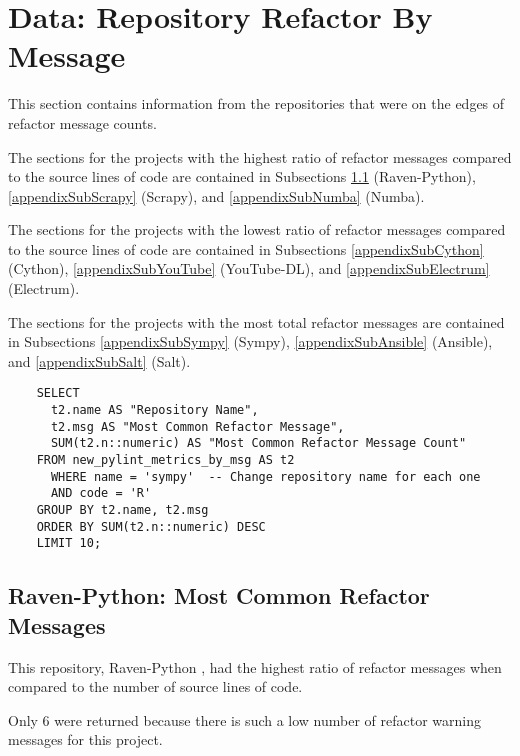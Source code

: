 \newpage
\section{Data: Repository Refactor By Message} \label{appendixRefactorMsgCounts}

This section contains information from the repositories that were on the edges of refactor message counts.

The sections for the projects with the highest ratio of refactor messages compared to the source lines of code are contained in Subsections \ref{appendixSubRavenPython} (Raven-Python), \ref{appendixSubScrapy} (Scrapy), and \ref{appendixSubNumba} (Numba).

The sections for the projects with the lowest ratio of refactor messages compared to the source lines of code are contained in Subsections \ref{appendixSubCython} (Cython), \ref{appendixSubYouTube} (YouTube-DL), and \ref{appendixSubElectrum} (Electrum).

The sections for the projects with the most total refactor messages are contained in Subsections \ref{appendixSubSympy} (Sympy),  \ref{appendixSubAnsible} (Ansible), and \ref{appendixSubSalt} (Salt).

\begin{singlespace}
  \begin{verbatim}
    SELECT
      t2.name AS "Repository Name",
      t2.msg AS "Most Common Refactor Message",
      SUM(t2.n::numeric) AS "Most Common Refactor Message Count"
    FROM new_pylint_metrics_by_msg AS t2
      WHERE name = 'sympy'  -- Change repository name for each one
      AND code = 'R'
    GROUP BY t2.name, t2.msg
    ORDER BY SUM(t2.n::numeric) DESC
    LIMIT 10;
  \end{verbatim}
\end{singlespace}


\newpage
\subsection{Raven-Python: Most Common Refactor Messages} \label{appendixSubRavenPython}
This repository, Raven-Python \cite{data:raven-python}, had the highest ratio of refactor messages when compared to the number of source lines of code.

Only 6 were returned because there is such a low number of refactor warning messages for this project.

